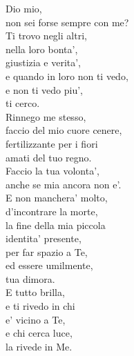 \begin{haiku}
    Dio mio,\\
    non sei forse sempre con me?\\
    Ti trovo negli altri,\\
    nella loro bonta',\\
    giustizia e verita',\\
    e quando in loro non ti vedo,\\
    e non ti vedo piu',\\
    ti cerco.\\
    Rinnego me stesso,\\
    faccio del mio cuore cenere,\\
    fertilizzante per i fiori\\
    amati del tuo regno.\\
    Faccio la tua volonta',\\
    anche se mia ancora non e'.\\
    E non manchera' molto,\\
    d'incontrare la morte,\\
    la fine della mia piccola\\
    identita' presente,\\
    per far spazio a Te,\\
    ed essere umilmente,\\
    tua dimora.\\
    E tutto brilla,\\
    e ti rivedo in chi \\
    e' vicino a Te,\\
    e chi cerca luce,\\
    la rivede in Me.\\
\end{haiku}

